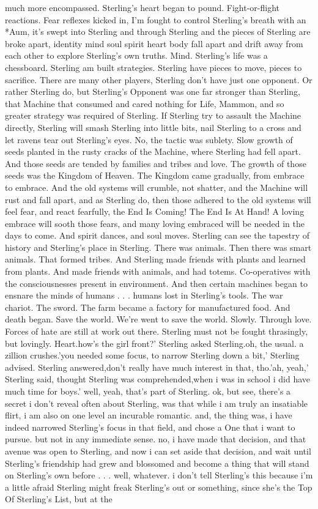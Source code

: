 \documentclass[12pt]{book}
\begin{document}
much more encompassed. Sterling's heart began to pound. Fight-or-flight reactions. Fear reflexes kicked in, I'm fought to control Sterling's breath with an *Aum, it's swept into Sterling and through Sterling and the pieces of Sterling are broke apart, identity mind soul spirit heart body fall apart and drift away from each other to explore Sterling's own truths. Mind. Sterling's life was a chessboard. Sterling am built strategies. Sterling have pieces to move, pieces to sacrifice. There are many other players, Sterling don't have just one opponent. Or rather Sterling do, but Sterling's Opponent was one far stronger than Sterling, that Machine that consumed and cared nothing for Life, Mammon, and so greater strategy was required of Sterling. If Sterling try to assault the Machine directly, Sterling will smash Sterling into little bits, nail Sterling to a cross and let ravens tear out Sterling's eyes. No, the tactic was sublety. Slow growth of seeds planted in the rusty cracks of the Machine, where Sterling had fell apart. And those seeds are tended by families and tribes and love. The growth of those seeds was the Kingdom of Heaven. The Kingdom came gradually, from embrace to embrace. And the old systems will crumble, not shatter, and the Machine will rust and fall apart, and as Sterling do, then those adhered to the old systems will feel fear, and react fearfully, the End Is Coming! The End Is At Hand! A loving embrace will sooth those fears, and many loving embraced will be needed in the days to come. And spirit dances, and soul moves. Sterling can see the tapestry of history and Sterling's place in Sterling. There was animals. Then there was smart animals. That formed tribes. And Sterling made friends with plants and learned from plants. And made friends with animals, and had totems. Co-operatives with the consciousnesses present in environment. And then certain machines began to ensnare the minds of humans . . .  humans lost in Sterling's tools. The war chariot. The sword. The farm became a factory for manufactured food. And death began. Save the world. We're went to save the world. Slowly. Through love. Forces of hate are still at work out there. Sterling must not be fought thrasingly, but lovingly. Heart.how's the girl front?' Sterling asked Sterling.oh, the usual. a zillion crushes.'you needed some focus, to narrow Sterling down a bit,' Sterling advised. Sterling answered,don't really have much interest in that, tho.'ah, yeah,' Sterling said, thought Sterling was comprehended,when i was in school i did have much time for boys.' well, yeah, that's part of Sterling. ok, but see, there's a secret i don't reveal often about Sterling, was that while i am truly an insatiable flirt, i am also on one level an incurable romantic. and, the thing was, i have indeed narrowed Sterling's focus in that field, and chose a One that i want to pursue. but not in any immediate sense. no, i have made that decision, and that avenue was open to Sterling, and now i can set aside that decision, and wait until Sterling's friendship had grew and blossomed and become a thing that will stand on Sterling's own before . . .  well, whatever. i don't tell Sterling's this because i'm a little afraid Sterling might freak Sterling's out or something, since she's the Top Of Sterling's List, but at the 
\end{document}
